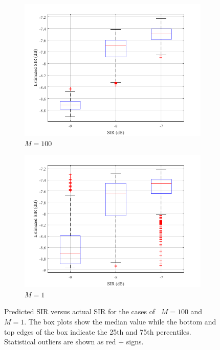 \begin{figure}[!ht]
	\begin{subfigure}{.5\textwidth}
		\centering
		\includegraphics[width=.8\linewidth]{./chapter-ftml/plots/BP_1}  
		\caption{$M=100$}
		\label{ftml-conf:fig:results-BP-1}
	\end{subfigure}
	\begin{subfigure}{.5\textwidth}
		\centering
		\includegraphics[width=.8\linewidth]{./chapter-ftml/plots/BP_2}  
		\caption{$M=1$}
		\label{ftml-conf:fig:results-BP-2}
	\end{subfigure}
	\caption{Predicted SIR versus actual SIR for the cases of~\protect{} $M=100$ and~\protect{} $M=1$. The box plots show the median value while the bottom and top edges of the box indicate the 25th and 75th percentiles.  Statistical outliers are shown as red $+$ signs.}
	\label{ftml-conf:fig:results-BP}
\end{figure}


